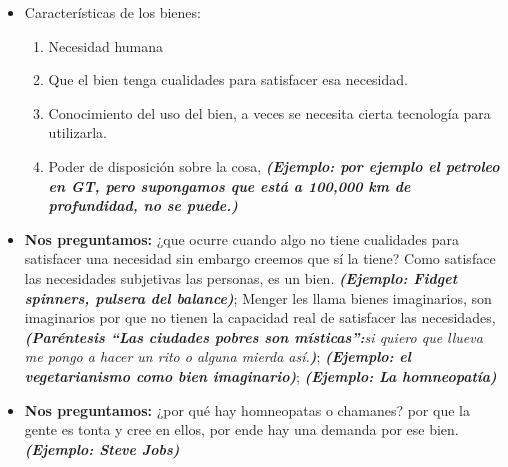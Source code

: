 \begin{itemize}
    \item Características de los bienes:
    \begin{enumerate}
        \item Necesidad humana
        \item Que el bien tenga cualidades para satisfacer esa necesidad.
        \item Conocimiento del uso del bien, a veces se necesita cierta tecnología para utilizarla.
        \item Poder de disposición sobre la cosa, \textbf{\emph{(Ejemplo: por ejemplo el petroleo en GT, pero supongamos que está a 100,000 km de profundidad, no se puede.)}}
    \end{enumerate}

    
    \item \textbf{Nos preguntamos:} ¿que ocurre cuando algo no tiene cualidades para satisfacer una necesidad sin embargo creemos que sí la tiene? Como satisface las necesidades subjetivas las personas, es un bien. \textbf{\emph{(Ejemplo: Fidget spinners, pulsera del balance)}}; Menger les llama bienes imaginarios, son imaginarios por que no tienen la capacidad real de satisfacer las necesidades, \emph{\textbf{(Paréntesis ``Las ciudades pobres son místicas'':}si quiero que llueva me pongo a hacer un rito o alguna mierda así.\textbf{)}}; \textbf{\emph{(Ejemplo: el vegetarianismo como bien imaginario)}}; \textbf{\emph{(Ejemplo: La homneopatía)}}

    \item \textbf{Nos preguntamos:} ¿por qué hay homneopatas o chamanes? por que la gente es tonta y cree en ellos, por ende hay una demanda por ese bien. \textbf{\emph{(Ejemplo: Steve Jobs)}}


\end{itemize}
